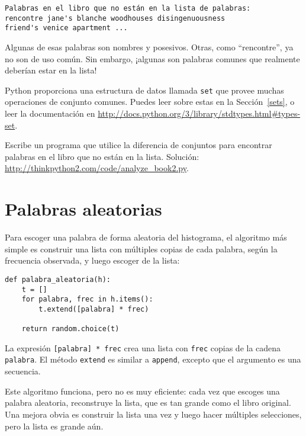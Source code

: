 \documentclass[10pt]{book}
\begin{document}
\begin{verbatim}
Palabras en el libro que no están en la lista de palabras:
rencontre jane's blanche woodhouses disingenuousness
friend's venice apartment ...
\end{verbatim}
%
Algunas de esas palabras son nombres y posesivos.  Otras, como
``rencontre'', ya no son de uso común.  Sin embargo, ¡algunas son
palabras comunes que realmente deberían estar en la lista!

\begin{exercise}

Python proporciona una estructura de datos llamada {\tt set} que provee muchas
operaciones de conjunto comunes.  Puedes leer sobre estas en la Sección~\ref{sets},
o leer la documentación en
\url{http://docs.python.org/3/library/stdtypes.html#types-set}.

Escribe un programa que utilice la diferencia de conjuntos para encontrar palabras en el libro
que no están en la lista.  Solución:
\url{http://thinkpython2.com/code/analyze_book2.py}.

\end{exercise}


\section{Palabras aleatorias}
\label{randomwords}

Para escoger una palabra de forma aleatoria del histograma, el algoritmo más simple
es construir una lista con múltiples copias de cada palabra, según
la frecuencia observada, y luego escoger de la lista:

\begin{verbatim}
def palabra_aleatoria(h):
    t = []
    for palabra, frec in h.items():
        t.extend([palabra] * frec)

    return random.choice(t)
\end{verbatim}
%
La expresión {\tt [palabra] * frec} crea una lista con {\tt frec}
copias de la cadena {\tt palabra}.  El método {\tt extend}
es similar a {\tt append}, excepto que el argumento es
una secuencia.

Este algoritmo funciona, pero no es muy eficiente: cada vez que
escoges una palabra aleatoria, reconstruye la lista, que es tan grande como
el libro original.  Una mejora obvia es construir la lista
una vez y luego hacer múltiples selecciones, pero la lista es grande aún.
\end{document}
